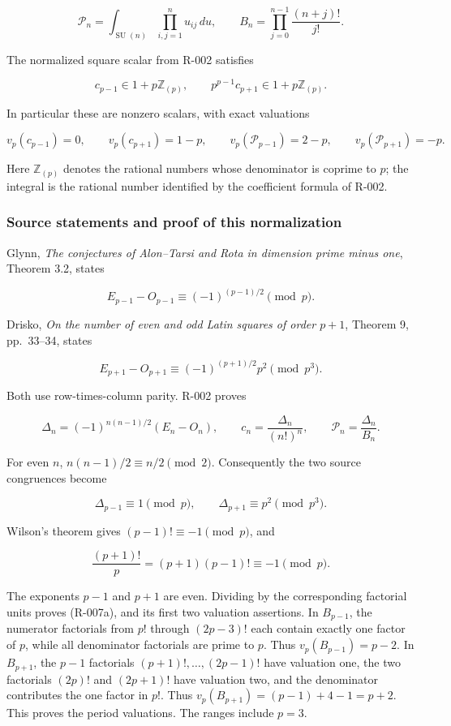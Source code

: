\documentclass[
  10pt,
]{article}
\begin{document}
\[
 \mathcal P_n=\int_{\operatorname{SU}(n)}\prod_{i,j=1}^{n}u_{ij}\,du,
 \qquad
 B_n=\prod_{j=0}^{n-1}\frac{(n+j)!}{j!}.
\]

The normalized square scalar from R-002 satisfies

\[
 \boxed{c_{p-1}\in1+p\mathbb Z_{(p)},\qquad
        p^{p-1}c_{p+1}\in1+p\mathbb Z_{(p)}.}
 \tag{R-007a}
\]

In particular these are nonzero scalars, with exact valuations

\[
 v_p(c_{p-1})=0,\qquad v_p(c_{p+1})=1-p,
 \qquad
 v_p(\mathcal P_{p-1})=2-p,\qquad
 v_p(\mathcal P_{p+1})=-p.
 \tag{R-007b}
\]

Here \(\mathbb Z_{(p)}\) denotes the rational numbers whose denominator
is coprime to \(p\); the integral is the rational number identified by
the coefficient formula of R-002.

\subsubsection{Source statements and proof of this
normalization}\label{source-statements-and-proof-of-this-normalization}

Glynn, \emph{The conjectures of Alon--Tarsi and Rota in dimension prime
minus one}, Theorem 3.2, states

\[
 E_{p-1}-O_{p-1}\equiv(-1)^{(p-1)/2}\pmod p.
\]

Drisko, \emph{On the number of even and odd Latin squares of order
\(p+1\)}, Theorem 9, pp.~33--34, states

\[
 E_{p+1}-O_{p+1}\equiv(-1)^{(p+1)/2}p^2\pmod {p^3}.
\]

Both use row-times-column parity. R-002 proves

\[
 \Delta_n=(-1)^{n(n-1)/2}(E_n-O_n),\qquad
 c_n=\frac{\Delta_n}{(n!)^n},\qquad \mathcal P_n=\frac{\Delta_n}{B_n}.
\]

For even \(n\), \(n(n-1)/2\equiv n/2\pmod2\). Consequently the two
source congruences become

\[
 \Delta_{p-1}\equiv1\pmod p,
 \qquad \Delta_{p+1}\equiv p^2\pmod {p^3}.
\]

Wilson's theorem gives \((p-1)!\equiv-1\pmod p\), and

\[
 \frac{(p+1)!}{p}=(p+1)(p-1)!\equiv-1\pmod p.
\]

The exponents \(p-1\) and \(p+1\) are even. Dividing by the
corresponding factorial units proves (R-007a), and its first two
valuation assertions. In \(B_{p-1}\), the numerator factorials from
\(p!\) through \((2p-3)!\) each contain exactly one factor of \(p\),
while all denominator factorials are prime to \(p\). Thus
\(v_p(B_{p-1})=p-2\). In \(B_{p+1}\), the \(p-1\) factorials
\((p+1)!,\ldots,(2p-1)!\) have valuation one, the two factorials
\((2p)!\) and \((2p+1)!\) have valuation two, and the denominator
contributes the one factor in \(p!\). Thus
\(v_p(B_{p+1})=(p-1)+4-1=p+2\). This proves the period valuations. The
ranges include \(p=3\).
\end{document}
